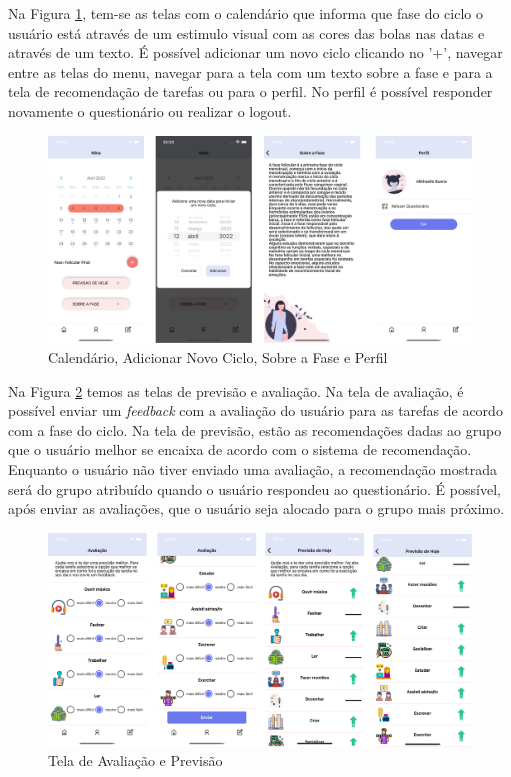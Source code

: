 Na Figura \ref{fig21}, tem-se as telas com o calendário que informa que fase do ciclo o usuário está através 
de um estimulo visual com as cores das bolas nas datas e através de um texto. É possível adicionar um novo ciclo 
clicando no '+', navegar entre as telas do menu, navegar para a tela com um texto sobre a fase e para a tela 
de recomendação de tarefas ou para o perfil. No perfil é possível responder novamente o questionário ou 
realizar o logout.

\begin{figure}[ht]
	\caption{Calendário, Adicionar Novo Ciclo, Sobre a Fase e Perfil}
	\begin{center}
	\includegraphics[keepaspectratio=true,scale=0.08]{figuras/aplicativo2.png}
	\end{center}
    \label{fig21}
\end{figure}


Na Figura \ref{fig22} temos as telas de previsão e avaliação. Na tela de avaliação, é possível enviar 
um \emph{feedback} com a avaliação do usuário para as tarefas de acordo com a fase do ciclo. Na tela de 
previsão, estão as recomendações dadas ao grupo que o usuário melhor se encaixa de acordo com o sistema de recomendação.
Enquanto o usuário não tiver enviado uma avaliação, a recomendação mostrada será do grupo atribuído quando o 
usuário respondeu ao questionário. É possível, 
após enviar as avaliações, que o usuário seja alocado para o grupo mais próximo.

\begin{figure}[ht]
	\caption{Tela de Avaliação e Previsão}
	\begin{center}
	\includegraphics[keepaspectratio=true,scale=0.08]{figuras/aplicativo3.png}
	\end{center}
    \label{fig22}
\end{figure}

